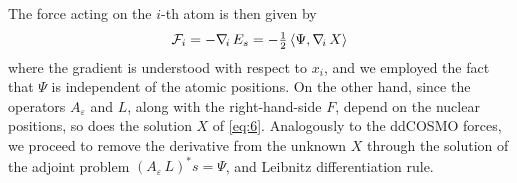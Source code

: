 
The force acting on the $i$-th atom is then given by
\[
\mathcal{F}_i = -\nabla_{\!i}\, E_s = - \tfrac{1}{2} 
\,  \langle \Psi, \nabla_{\!i}\, X \rangle 
\]
where the gradient is understood with respect to $x_i$, and we employed the fact that $\Psi$ is independent of the atomic positions. On the other hand, since the operators $A_\varepsilon$ and $L$, along with the right-hand-side $F$, depend on the nuclear positions, so does the solution $X$ of \eqref{eq:6}. Analogously to the ddCOSMO forces, we proceed to remove the derivative from the unknown $X$ through the solution of the adjoint problem $(A_\varepsilon \, L)^* s = \Psi$, and Leibnitz differentiation rule.

